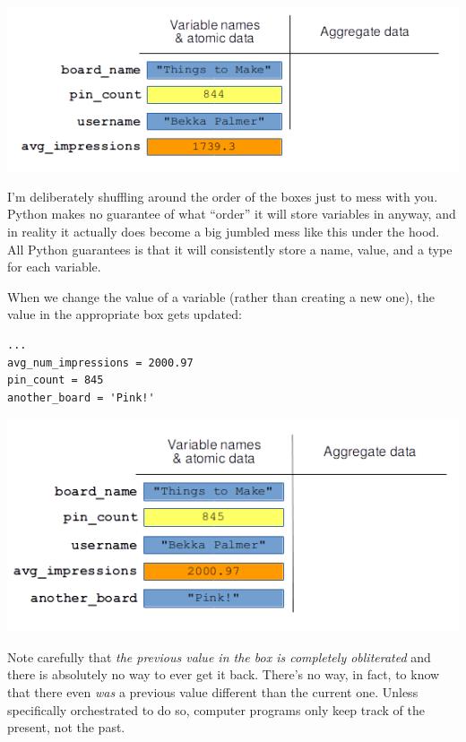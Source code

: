 \vspace{-.2in}
\begin{center}
\includegraphics[width=.8\textwidth]{memoryPicture3.png}
\end{center}

I'm deliberately shuffling around the order of the boxes just to mess with you.
Python makes no guarantee of what ``order'' it will store variables in anyway,
and in reality it actually does become a big jumbled mess like this under the
hood. All Python guarantees is that it will consistently store a name, value,
and a type for each variable.

When we change the value of a variable (rather than creating a new one), the
value in the appropriate box gets updated:

\begin{Verbatim}[fontsize=\small,samepage=true,frame=single,framesep=3mm]
...
avg_num_impressions = 2000.97
pin_count = 845
another_board = 'Pink!'
\end{Verbatim}

\vspace{-.2in}
\begin{center}
\includegraphics[width=.8\textwidth]{memoryPicture4.png}
\end{center}

Note carefully that \textit{the previous value in the box is completely
obliterated} and there is absolutely no way to ever get it back. There's no
way, in fact, to know that there even \textit{was} a previous value different
than the current one. Unless specifically orchestrated to do so, computer
programs only keep track of the present, not the past.
